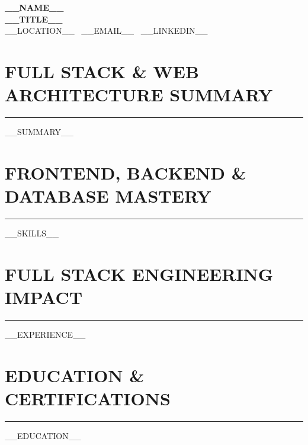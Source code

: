 \documentclass[10pt,letterpaper]{article}
\begin{document}
\begin{center}
    {\LARGE \textbf{__NAME__}} \\
    \vspace{2pt}
    \textbf{__TITLE__} \\
    __LOCATION__ \textbar\ __EMAIL__ \textbar\ __LINKEDIN__
\end{center}

\vspace{-6pt}
\section*{FULL STACK \& WEB ARCHITECTURE SUMMARY}
\vspace{-4pt}
\hrule
\vspace{4pt}
__SUMMARY__

\section*{FRONTEND, BACKEND \& DATABASE MASTERY}
\vspace{-4pt}
\hrule
\vspace{4pt}
__SKILLS__

\section*{FULL STACK ENGINEERING IMPACT}
\vspace{-4pt}
\hrule
\vspace{4pt}
__EXPERIENCE__

\section*{EDUCATION \& CERTIFICATIONS}
\vspace{-4pt}
\hrule
\vspace{4pt}
__EDUCATION__
\end{document}

